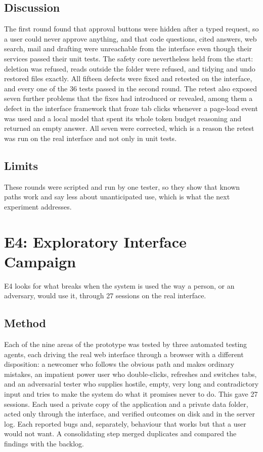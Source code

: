 \documentclass{FastFyp}
\begin{document}
\subsection{Discussion}
The first round found that approval buttons were hidden after a typed request, so a user could never approve anything, and that code questions, cited answers, web search, mail and drafting were unreachable from the interface even though their services passed their unit tests. The safety core nevertheless held from the start: deletion was refused, reads outside the folder were refused, and tidying and undo restored files exactly. All fifteen defects were fixed and retested on the interface, and every one of the 36 tests passed in the second round. The retest also exposed seven further problems that the fixes had introduced or revealed, among them a defect in the interface framework that froze tab clicks whenever a page-load event was used and a local model that spent its whole token budget reasoning and returned an empty answer. All seven were corrected, which is a reason the retest was run on the real interface and not only in unit tests.

\subsection{Limits}
These rounds were scripted and run by one tester, so they show that known paths work and say less about unanticipated use, which is what the next experiment addresses.


\section{E4: Exploratory Interface Campaign}
\label{sec:campaign}
E4 looks for what breaks when the system is used the way a person, or an adversary, would use it, through 27 sessions on the real interface.

\subsection{Method}
Each of the nine areas of the prototype was tested by three automated testing agents, each driving the real web interface through a browser with a different disposition: a newcomer who follows the obvious path and makes ordinary mistakes, an impatient power user who double-clicks, refreshes and switches tabs, and an adversarial tester who supplies hostile, empty, very long and contradictory input and tries to make the system do what it promises never to do. This gave 27 sessions. Each used a private copy of the application and a private data folder, acted only through the interface, and verified outcomes on disk and in the server log. Each reported bugs and, separately, behaviour that works but that a user would not want. A consolidating step merged duplicates and compared the findings with the backlog.
\end{document}
